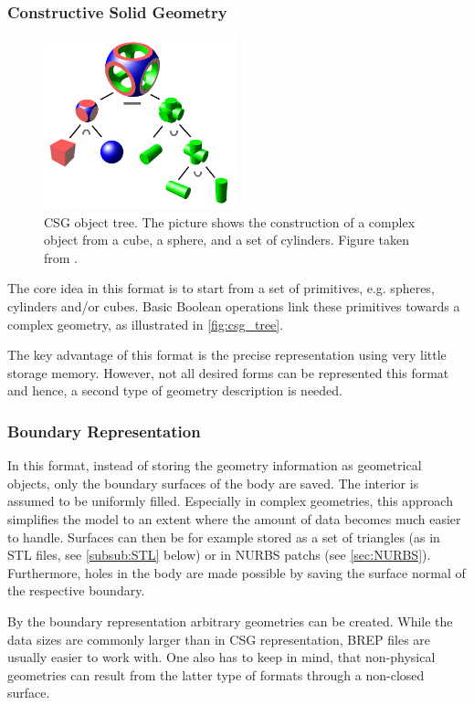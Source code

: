 \subsubsection{Constructive Solid Geometry}
\begin{figure}
\centering
\includegraphics[width=0.5\textwidth]{Pictures/Csg_tree.png}
\caption{\ac{CSG} object tree. The picture shows the construction of a complex object from a cube, a sphere, and a set of cylinders. Figure taken from \cite{WikipediaCSG}.}
\label{fig:csg_tree}
\end{figure}
The core idea in this format is to start from a set of primitives, e.g. spheres, cylinders and/or cubes. Basic Boolean operations link these primitives towards a complex geometry, as illustrated in \autoref{fig:csg_tree}.

The key advantage of this format is the precise representation using very little storage memory. However, not all desired forms can be represented this format and hence, a second type of geometry description is needed. 
\subsubsection{Boundary Representation}
In this format, instead of storing the geometry information as geometrical objects, only the boundary surfaces of the body are saved. The interior is assumed to be uniformly filled. Especially in complex geometries, this approach simplifies the model to an extent where the amount of data becomes much easier to handle. Surfaces can then be for example stored as a set of triangles (as in \ac{STL} files, see \autoref{subsub:STL} below) or in \ac{NURBS} \acsp{patch} (see \autoref{sec:NURBS}).
Furthermore, holes in the body are made possible by saving the surface normal of the respective boundary. 

By the boundary representation arbitrary geometries can be created. While the data sizes are commonly larger than in \ac{CSG} representation, \ac{BREP} files are usually easier to work with. One also has to keep in mind, that non-physical geometries can result from the latter type of formats through a non-closed surface.
